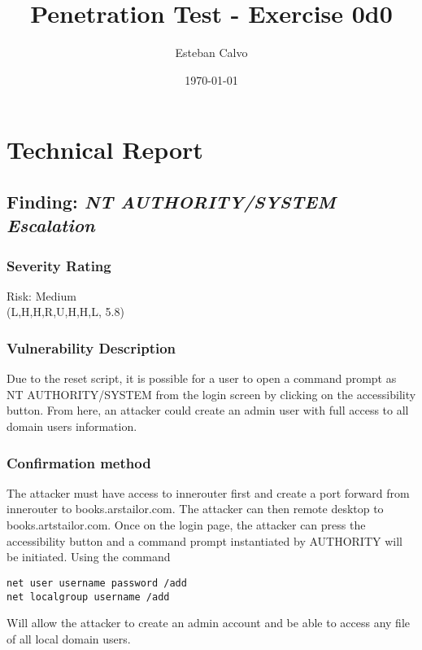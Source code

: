 \documentclass[notitlepage]{article}
\begin{document}
  
\title{Penetration Test - Exercise 0d0}
\author{Esteban Calvo}
\date{\isodate\today}

\maketitle

\tableofcontents

\newpage
\section{Technical Report}

  \subsection{Finding: \emph{NT AUTHORITY/SYSTEM Escalation}}
  
	\subsubsection*{Severity Rating}
    Risk: Medium \\
    \cvss(L,H,H,R,U,H,H,L, 5.8)
		
  	\subsubsection*{Vulnerability Description}
  		Due to the reset script, it is possible for a user to open a command prompt as NT AUTHORITY/SYSTEM from the login screen
        by clicking on the accessibility button. From here, an attacker could create an admin user with full access to all domain users
        information.

  	\subsubsection*{Confirmation method}
  	The attacker must have access to innerouter first and create a port forward from innerouter to books.arstailor.com. The attacker can then remote
    desktop to books.artstailor.com. Once on the login page, the attacker can press the accessibility button and a command prompt instantiated by AUTHORITY
    will be initiated. Using the command
\begin{verbatim}
net user username password /add
net localgroup username /add
\end{verbatim}
    Will allow the attacker to create an admin account and be able to access any file of all local domain users.
\end{document}
